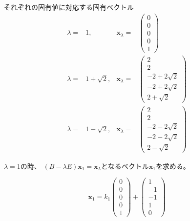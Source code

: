 \documentclass[12pt,b5paper]{ltjsarticle}
\begin{document}
それぞれの固有値に対応する固有ベクトル
\begin{align}
 \lambda =& 1,&
 \bm{x}_\lambda =& \begin{pmatrix} 0\\0\\0\\0\\1 \end{pmatrix}\\
 \lambda =& 1+\sqrt{2},&
 \bm{x}_\lambda =& %
 \begin{pmatrix} 2 \\ 2 \\ -2+2\sqrt{2} \\ -2+2\sqrt{2} \\ 2+\sqrt{2} \end{pmatrix}\\
 \lambda =& 1-\sqrt{2},&
 \bm{x}_\lambda =& %
 \begin{pmatrix} 2 \\ 2 \\ -2-2\sqrt{2} \\ -2-2\sqrt{2} \\ 2-\sqrt{2} \end{pmatrix}
\end{align}

$\lambda =1$の時、%
$(B-\lambda E)\bm{x}_1=\bm{x}_\lambda$となるベクトル$\bm{x}_1$を求める。

\begin{equation}
 \bm{x}_1
       = k_1\begin{pmatrix} 0\\0\\0\\0\\1 \end{pmatrix}
       + \begin{pmatrix} 1\\-1\\-1\\1\\0 \end{pmatrix}
\end{equation}
\end{document}
